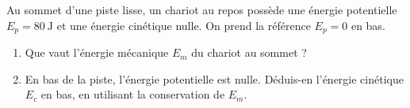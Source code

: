 \documentclass[11pt,a4paper]{article}
\begin{document}
\begin{exo}
Au sommet d'une piste lisse, un chariot au repos possède une énergie potentielle
$E_p=\qty{80}{\joule}$ et une énergie cinétique nulle. On prend la référence $E_p=0$ en bas.
\begin{enumerate}[label=\alph*)]
  \item Que vaut l'énergie mécanique $E_m$ du chariot au sommet ?
  \item En bas de la piste, l'énergie potentielle est nulle. Déduis-en l'énergie cinétique $E_c$ en
        bas, en utilisant la conservation de $E_m$.
\end{enumerate}
\end{exo}
\end{document}
